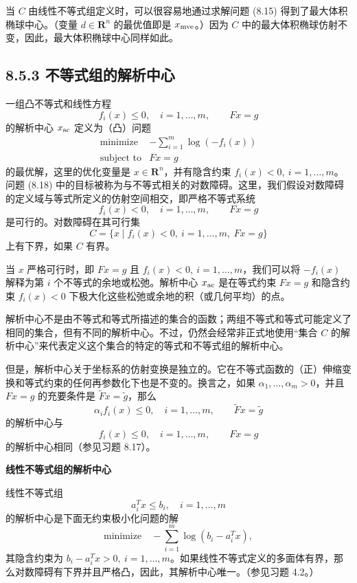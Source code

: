 \documentclass[UTF8,12pt,a4paper,fontset=fandol]{ctexart}
\begin{document}
当 $C$ 由线性不等式组定义时，可以很容易地通过求解问题 (8.15) 得到了最大体积椭球中心。（变量 $d\in\mathbf{R}^n$ 的最优值即是 $x_{\rm mve}$。）因为 $C$ 中的最大体积椭球仿射不变，因此，最大体积椭球中心同样如此。

\subsection*{8.5.3 不等式组的解析中心}

一组凸不等式和线性方程
\[
f_i(x)\leq 0,\quad i=1,\ldots,m,\qquad Fx=g
\]
的解析中心 $x_{\rm ac}$ 定义为（凸）问题
\[
\begin{array}{ll}
\mbox{minimize} & -\displaystyle\sum_{i=1}^m \log(-f_i(x))\\
\mbox{subject to} & Fx=g
\end{array}
\tag{8.18}
\]
的最优解，这里的优化变量是 $x\in\mathbf{R}^n$，并有隐含约束 $f_i(x)<0,\ i=1,\ldots,m$。问题 (8.18) 中的目标被称为与不等式相关的对数障碍。这里，我们假设对数障碍的定义域与等式所定义的仿射空间相交，即严格不等式系统
\[
f_i(x)<0,\quad i=1,\ldots,m,\qquad Fx=g
\]
是可行的。对数障碍在其可行集
\[
C=\{x\mid f_i(x)<0,\ i=1,\ldots,m,\ Fx=g\}
\]
上有下界，如果 $C$ 有界。

当 $x$ 严格可行时，即 $Fx=g$ 且 $f_i(x)<0,\ i=1,\ldots,m$，我们可以将 $-f_i(x)$ 解释为第 $i$ 个不等式的余地或松弛。解析中心 $x_{\rm ac}$ 是在等式约束 $Fx=g$ 和隐含约束 $f_i(x)<0$ 下极大化这些松弛或余地的积（或几何平均）的点。

解析中心不是由不等式和等式所描述的集合的函数；两组不等式和等式可能定义了相同的集合，但有不同的解析中心。不过，仍然会经常非正式地使用“集合 $C$ 的解析中心”来代表定义这个集合的特定的等式和不等式组的解析中心。

但是，解析中心关于坐标系的仿射变换是独立的。它在不等式函数的（正）伸缩变换和等式约束的任何再参数化下也是不变的。换言之，如果 $\alpha_1,\ldots,\alpha_m>0$，并且 $Fx=g$ 的充要条件是 $\tilde F x=\tilde g$，那么
\[
\alpha_i f_i(x)\leq 0,\quad i=1,\ldots,m,\qquad \tilde F x=\tilde g
\]
的解析中心与
\[
f_i(x)\leq 0,\quad i=1,\ldots,m,\qquad Fx=g
\]
的解析中心相同（参见习题 8.17）。

\noindent\textbf{线性不等式组的解析中心}

线性不等式组
\[
a_i^Tx\leq b_i,\quad i=1,\ldots,m
\]
的解析中心是下面无约束极小化问题的解
\[
\mbox{minimize}\quad -\sum_{i=1}^m \log(b_i-a_i^Tx),
\tag{8.19}
\]
其隐含约束为 $b_i-a_i^Tx>0,\ i=1,\ldots,m$。如果线性不等式定义的多面体有界，那么对数障碍有下界并且严格凸，因此，其解析中心唯一。（参见习题 4.2。）
\end{document}
